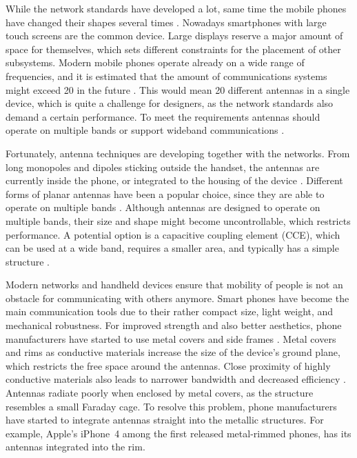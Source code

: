 While the network standards have developed a lot, same time the mobile phones have changed their shapes several times \cite{anguera2}. Nowadays smartphones with large touch screens are the common device. Large displays reserve a major amount of space for themselves, which sets different constraints for the placement of other subsystems. Modern mobile phones operate already on a wide range of frequencies, and it is estimated that the amount of communications systems might exceed 20 in the future \cite{20ant}. This would mean 20 different antennas in a single device, which is quite a challenge for designers, as the network standards also demand a certain performance. To meet the requirements antennas should operate on multiple bands or support wideband communications \cite{lehtovuori_wideband_match}.

Fortunately, antenna techniques are developing together with the networks. From long monopoles and dipoles sticking outside the handset, the antennas are currently inside the phone, or integrated to the housing of the device \cite{saunders,molisch}. Different forms of planar antennas have been a popular choice, since they are able to operate on multiple bands \cite{anguera}. Although antennas are designed to operate on multiple bands, their size and shape might become uncontrollable, which restricts performance. A potential option is a capacitive coupling element (CCE), which can be used at a wide band, requires a smaller area, and typically has a simple structure \cite{valkonen_cce2}.

Modern networks and handheld devices ensure that mobility of people is not an obstacle for communicating with others anymore. Smart phones have become the main communication tools due to their rather compact size, light weight, and mechanical robustness. For improved strength and also better aesthetics, phone manufacturers have started to use metal covers and side frames \cite{rowell}. Metal covers and rims as conductive materials increase the size of the device's ground plane, which restricts the free space around the antennas. Close proximity of highly conductive materials also leads to narrower bandwidth and decreased efficiency \cite{rowell}. Antennas radiate poorly when enclosed by metal covers, as the structure resembles a small Faraday cage. To resolve this problem, phone manufacturers have started to integrate antennas straight into the metallic structures. For example, Apple's iPhone~4 among the first released metal-rimmed phones, has its antennas integrated into the rim. 


